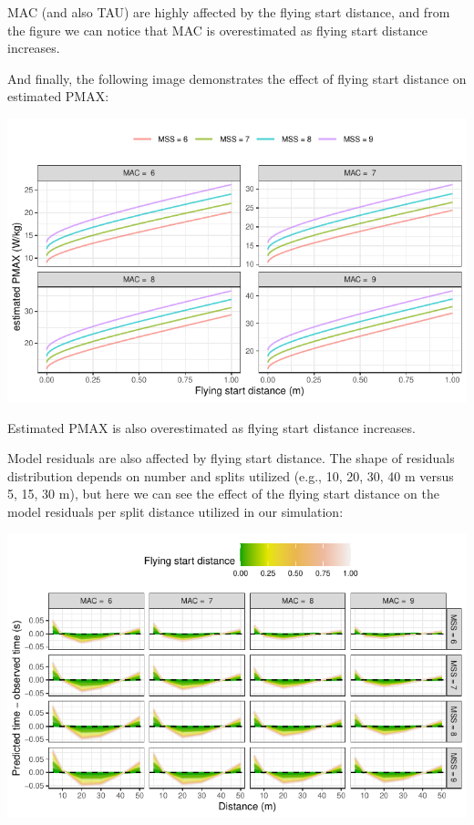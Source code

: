 \documentclass[fleqn,10pt,lineno]{wlpeerj} %
\begin{document}
MAC (and also TAU) are highly affected by the flying start distance, and from the figure we can notice that MAC is overestimated as flying start distance increases.

And finally, the following image demonstrates the effect of flying start distance on estimated PMAX:

\begin{center}\includegraphics[width=0.9\linewidth]{paper_files/figure-latex/unnamed-chunk-31-1} \end{center}

Estimated PMAX is also overestimated as flying start distance increases.

Model residuals are also affected by flying start distance. The shape of residuals distribution depends on number and splits utilized (e.g., 10, 20, 30, 40 m versus 5, 15, 30 m), but here we can see the effect of the flying start distance on the model residuals per split distance utilized in our simulation:

\begin{center}\includegraphics[width=0.9\linewidth]{paper_files/figure-latex/unnamed-chunk-32-1} \end{center}
\end{document}
